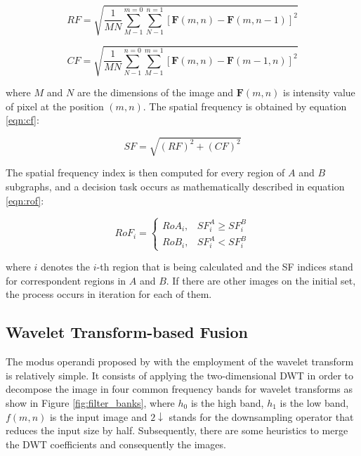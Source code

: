 \begin{equation}
\label{eqn:rf}
    RF = \sqrt{\frac{1}{MN}
    \sum_{M-1}^{m=0}
    \sum_{N-1}^{n=1}
    [\mathbf{F}(m,n) - \mathbf{F}(m,n-1)]^{2}}
\end{equation}

\begin{equation}
\label{eqn:cf}
    CF = \sqrt{\frac{1}{MN}
    \sum_{N-1}^{n=0}
    \sum_{M-1}^{m=1}
    [\mathbf{F}(m,n) - \mathbf{F}(m-1,n)]^{2}}
\end{equation}

\noindent where $M$ and $N$ are the dimensions of the image and $\mathbf{F}(m,n)$ is intensity value of pixel at the position $(m,n)$. The spatial frequency is obtained by equation \ref{eqn:cf}:

\begin{equation}
\label{eqn:sf}
    SF = \sqrt{(RF)^{2} + (CF)^{2}}
\end{equation}

The spatial frequency index is then computed for every region of $A$ and $B$ subgraphs, and a decision task occurs as mathematically described in equation \ref{eqn:rof}:

\begin{equation}
\label{eqn:rof}
    RoF_{i} = 
    \begin{cases}
        RoA_{i}, & SF_{i}^{A} \geq SF_{i}^{B}\\
        RoB_{i}, & SF_{i}^{A} < SF_{i}^{B}
    \end{cases}
\end{equation}

\noindent where $i$ denotes the $i$-th region that is being calculated and the SF indices stand for correspondent regions in $A$ and $B$. If there are other images on the initial set, the process occurs in iteration for each of them.

\subsection{Wavelet Transform-based Fusion}

The modus operandi proposed by  with the employment of the wavelet transform is relatively simple. It consists of applying the two-dimensional DWT in order to decompose the image in four common frequency bands for wavelet transforms as show in Figure \ref{fig:filter_banks}, where $h_{0}$ is the high band, $h_{1}$ is the low band, $f(m,n)$ is the input image and $2\downarrow$ stands for the downsampling operator that reduces the input size by half. Subsequently, there are some heuristics to merge the DWT coefficients and consequently the images.

